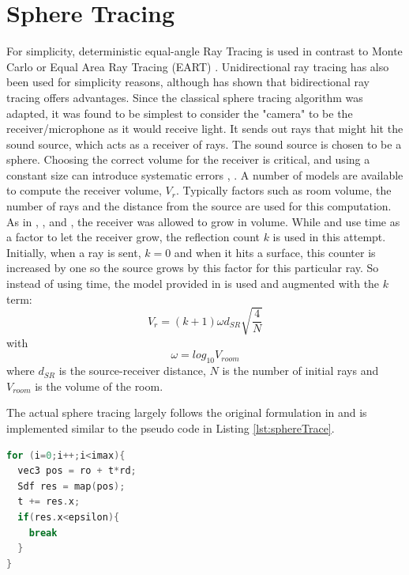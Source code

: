 \documentclass[twoside,a4paper]{article}
\begin{document}
\section{Sphere Tracing}
For simplicity, deterministic equal-angle Ray Tracing is used in contrast to Monte Carlo or Equal Area Ray Tracing (EART) \cite{gu_room_2014}. Unidirectional ray tracing has also been used for simplicity reasons, although \cite{cao_interactive_2016} has shown that bidirectional ray tracing offers advantages. Since the classical sphere tracing algorithm was adapted, it was found to be simplest to consider the "camera" to be the receiver/microphone as it would receive light. It sends out rays that might hit the sound source, which acts as a receiver of rays. The sound source is chosen to be a sphere. Choosing the correct volume for the receiver is critical, and using a constant size can introduce systematic errors \cite{xiangyang_accuracy_2003}, \cite{alpkocak_computing_2010}. A number of models are available to compute the receiver volume, $V_r$. Typically factors such as room volume, the number of rays and the distance from the source are used for this computation. 
As in \cite{brandao_ray_nodate}, \cite{alpkocak_computing_2010}, and \cite{dalenback_room_1996}, the receiver was allowed to grow in volume. While \cite{brandao_ray_nodate} and \cite{dalenback_room_1996} use time as a factor to let the receiver grow, the reflection count $k$ is used in this attempt. Initially, when a ray is sent, $k=0$ and when it hits a surface, this counter is increased by one so the source grows by this factor for this particular ray. So instead of using time, the model provided in \cite{alpkocak_computing_2010} is used and augmented with the $k$ term:
\begin{equation}
V_r = (k+1) \omega d_{SR}\sqrt{\frac{4}{N}}
\end{equation}
with 
\begin{equation}
\omega = log_{10}{V_{room}}
\end{equation}
where $d_{SR}$ is the source-receiver distance, $N$ is the number of initial rays and $V_{room}$ is the volume of the room.\

The actual sphere tracing largely follows the original formulation in \cite{hart_sphere_1996} and is implemented similar to the pseudo code in Listing \ref{lst:sphereTrace}.

\begin{lstlisting}[language=C, caption={\it GLSL pseudo code for sphere tracing},captionpos=b,label=lst:sphereTrace]
for (i=0;i++;i<imax){
  vec3 pos = ro + t*rd;
  Sdf res = map(pos);
  t += res.x;
  if(res.x<epsilon){
    break
  }
}
\end{lstlisting} 
\end{document}
